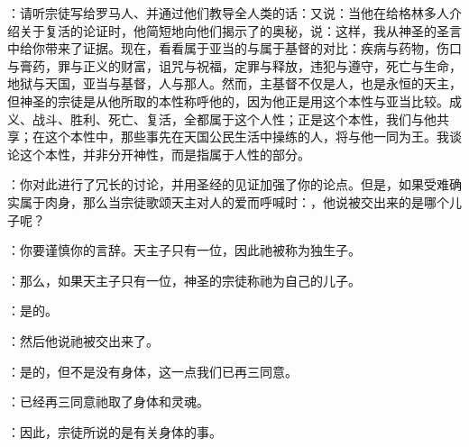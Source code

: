 ：请听宗徒写给罗马人、并通过他们教导全人类的话：又说：当他在给格林多人介绍关于复活的论证时，他简短地向他们揭示了{}的奥秘，说：这样，我从神圣的圣言中给你带来了证据。现在，看看属于亚当的与属于基督的对比：疾病与药物，伤口与膏药，罪与正义的财富，诅咒与祝福，定罪与释放，违犯与遵守，死亡与生命，地狱与天国，亚当与基督，人与那人。然而，主基督不仅是人，也是永恒的天主，但神圣的宗徒是从他所取的本性称呼他的，因为他正是用这个本性与亚当比较。成义、战斗、胜利、死亡、复活，全都属于这个人性；正是这个本性，我们与他共享；在这个本性中，那些事先在天国公民生活中操练的人，将与他一同为王。我谈论这个本性，并非分开神性，而是指属于人性的部分。\par

：你对此进行了冗长的讨论，并用圣经的见证加强了你的论点。但是，如果受难确实属于肉身，那么当宗徒歌颂天主对人的爱而呼喊时：，他说被交出来的是哪个儿子呢？\par

：你要谨慎你的言辞。天主子只有一位，因此祂被称为独生子。\par

：那么，如果天主子只有一位，神圣的宗徒称祂为自己的儿子。\par

：是的。\par

：然后他说祂被交出来了。\par

：是的，但不是没有身体，这一点我们已再三同意。\par

：已经再三同意祂取了身体和灵魂。\par

：因此，宗徒所说的是有关身体的事。\par

